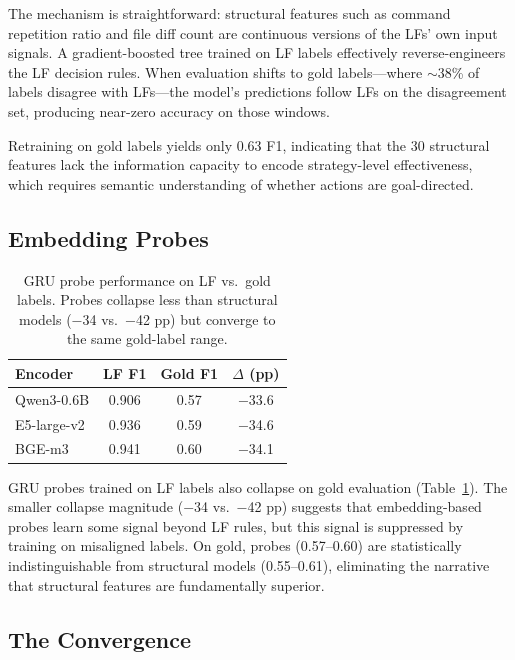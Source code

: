 \documentclass[11pt]{article}
\begin{document}
The mechanism is straightforward: structural features such as command repetition ratio and file diff count are continuous versions of the LFs' own input signals. A gradient-boosted tree trained on LF labels effectively reverse-engineers the LF decision rules. When evaluation shifts to gold labels---where $\sim$38\% of labels disagree with LFs---the model's predictions follow LFs on the disagreement set, producing near-zero accuracy on those windows.

Retraining on gold labels yields only 0.63 F1, indicating that the 30 structural features lack the information capacity to encode strategy-level effectiveness, which requires semantic understanding of whether actions are goal-directed.

\subsection{Embedding Probes}

\begin{table}[t]
\centering
\small
\begin{tabular}{lccc}
\toprule
\textbf{Encoder} & \textbf{LF F1} & \textbf{Gold F1} & \textbf{$\Delta$ (pp)} \\
\midrule
Qwen3-0.6B   & 0.906 & 0.57 & $-$33.6 \\
E5-large-v2  & 0.936 & 0.59 & $-$34.6 \\
BGE-m3       & 0.941 & 0.60 & $-$34.1 \\
\bottomrule
\end{tabular}
\caption{GRU probe performance on LF vs.\ gold labels. Probes collapse less than structural models ($-$34 vs.\ $-$42 pp) but converge to the same gold-label range.}
\label{tab:probe-collapse}
\end{table}

GRU probes trained on LF labels also collapse on gold evaluation (Table~\ref{tab:probe-collapse}). The smaller collapse magnitude ($-$34 vs.\ $-$42 pp) suggests that embedding-based probes learn some signal beyond LF rules, but this signal is suppressed by training on misaligned labels. On gold, probes (0.57--0.60) are statistically indistinguishable from structural models (0.55--0.61), eliminating the narrative that structural features are fundamentally superior.

\subsection{The Convergence}
\end{document}
